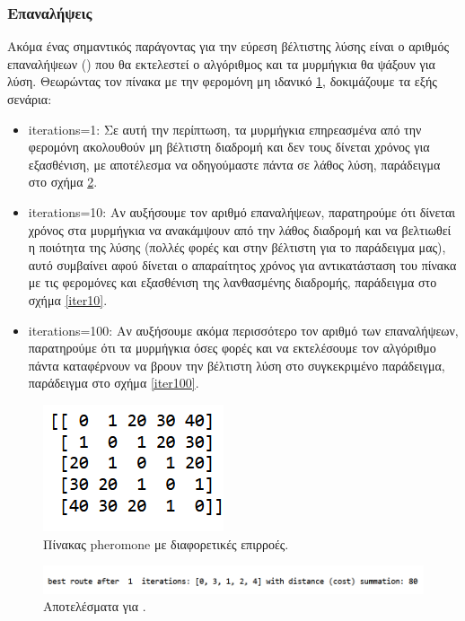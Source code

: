 \subsubsection{Επαναλήψεις}
Ακόμα ένας σημαντικός παράγοντας για την εύρεση βέλτιστης λύσης είναι ο αριθμός επαναλήψεων () που θα εκτελεστεί ο αλγόριθμος και τα μυρμήγκια θα ψάξουν για λύση. Θεωρώντας τον πίνακα με την φερομόνη μη ιδανικό  \ref{pher2}, δοκιμάζουμε τα εξής σενάρια:
\begin{itemize}
    \item iterations=1:
    Σε αυτή την περίπτωση, τα μυρμήγκια επηρεασμένα από την φερομόνη ακολουθούν μη βέλτιστη διαδρομή και δεν τους δίνεται χρόνος για εξασθένιση, με αποτέλεσμα να οδηγούμαστε πάντα σε λάθος λύση, παράδειγμα στο σχήμα \ref{iter1}.
    \item iterations=10:
    Αν αυξήσουμε τον αριθμό επαναλήψεων, παρατηρούμε ότι δίνεται χρόνος στα μυρμήγκια να ανακάμψουν από την λάθος διαδρομή και να βελτιωθεί η ποιότητα της λύσης (πολλές φορές και στην βέλτιστη για το παράδειγμα μας), αυτό συμβαίνει αφού δίνεται ο απαραίτητος χρόνος για αντικατάσταση του πίνακα με τις φερομόνες και εξασθένιση της λανθασμένης διαδρομής, παράδειγμα στο σχήμα \ref{iter10}.
    \item iterations=100:
    Αν αυξήσουμε ακόμα περισσότερο τον αριθμό των επαναλήψεων, παρατηρούμε ότι τα μυρμήγκια όσες φορές και να εκτελέσουμε τον αλγόριθμο πάντα καταφέρνουν να βρουν την βέλτιστη λύση στο συγκεκριμένο παράδειγμα, παράδειγμα στο σχήμα \ref{iter100}.
\end{itemize}
\begin{figure}
    \centering
    \includegraphics[scale=1]{2947_thesis/pictures/pheromone2.png} 
    \caption{Πίνακας pheromone με διαφορετικές επιρροές.}
    \label{pher2}
\end{figure}
\begin{figure}
    \centering
    \includegraphics[scale=0.60]{2947_thesis/pictures/ex4.png} 
    \caption{Αποτελέσματα για .}
    \label{iter1}
\end{figure}
